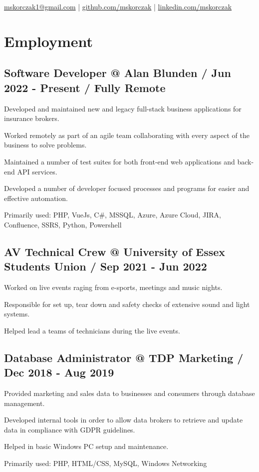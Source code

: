 \documentclass{article}
\makeatletter
\newcommand{\github}{https://github.com/mskorczak}
\renewcommand{\maketitle}
{
\begin{center}
{\fontsize{15}{10}\bfseries
\theauthor
}
\vspace{.5em}

    \href{mskorczak1@gmail.com}{mskorczak1@gmail.com} | \href{\github}{github.com/mskorczak} | \href{www.linkedin.com/in/mskorczak}{linkedin.com/mskorczak}

\end{center}
}
\makeatother
\begin{document}
\author{Michal Skorczak}

\maketitle

\section{Employment}

\subsection{Software Developer @ Alan Blunden / Jun 2022 - Present / Fully Remote}
\begin{compactitem}
\item Developed and maintained new and legacy full-stack business applications for insurance brokers.
\item Worked remotely as part of an agile team collaborating with every aspect of the business to solve problems.
\item Maintained a number of test suites for both front-end web applications and back-end API services.
\item Developed a number of developer focused processes and programs for easier and effective automation.
\item Primarily used: PHP, VueJs, C#, MSSQL, Azure, Azure Cloud, JIRA, Confluence, SSRS, Python, Powershell
\end{compactitem}

\subsection{AV Technical Crew @ University of Essex Students Union / Sep 2021 - Jun 2022}
\begin{compactitem}
\item Worked on live events raging from e-sports, meetings and music nights.
\item Responsible for set up, tear down and safety checks of extensive sound and light systems.
\item Helped lead a teams of technicians during the live events.
\end{compactitem}

\subsection{Database Administrator @ TDP Marketing / Dec 2018 - Aug 2019}
\begin{compactitem}
\item Provided marketing and sales data to businesses and consumers through database management.
\item Developed internal tools in order to allow data brokers to retrieve and update data in compliance with GDPR guidelines.
\item Helped in basic Windows PC setup and maintenance.
\item Primarily used: PHP, HTML/CSS, MySQL, Windows Networking 
\end{compactitem}
\end{document}

